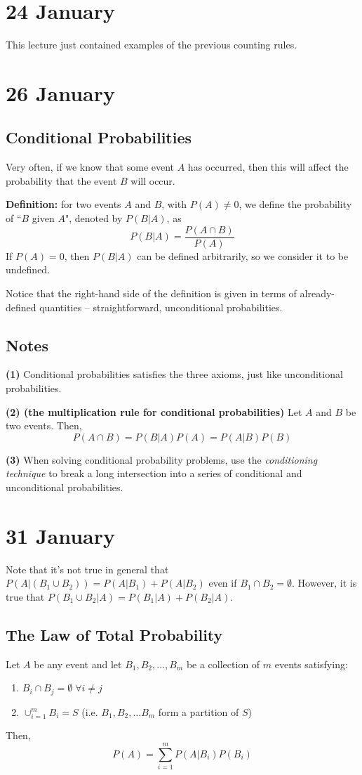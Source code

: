 \documentclass[12pt]{article}
\begin{document}
\section{24 January}
This lecture just contained examples of the previous counting rules.

\section{26 January}
\subsection{Conditional Probabilities}
Very often, if we know that some event $A$ has occurred, then this will affect the probability that the event $B$ will occur.

\textbf{Definition:} for two events $A$ and $B$, with $P(A) \neq 0$, we define the probability of ``$B$ given $A$", denoted by $P(B|A)$, as
\[
    P(B|A) = \frac{P(A \cap B)}{P(A)}
\]
If $P(A) = 0$, then $P(B|A)$ can be defined arbitrarily, so we consider it to be undefined.

Notice that the right-hand side of the definition is given in terms of already-defined quantities -- straightforward, unconditional probabilities. 

\subsection{Notes}
\textbf{(1)} Conditional probabilities satisfies the three axioms, just like unconditional probabilities.

\textbf{(2) (the multiplication rule for conditional probabilities)} Let $A$ and $B$ be two events. Then,
\[
    P(A \cap B) = P(B|A) P(A) = P(A|B) P(B)
\]

\textbf{(3)} When solving conditional probability problems, use the \emph{conditioning technique} to break a long intersection into a series of conditional and unconditional probabilities.

\section{31 January} 
Note that it's not true in general that $P(A | (B_1 \cup B_2)) = P(A | B_1) + P(A | B_2)$ even if $B_1 \cap B_2 = \emptyset$. However, it is true that $P(B_1 \cup B_2 | A) = P(B_1 | A) + P(B_2 | A)$.

\subsection{The Law of Total Probability}
Let $A$ be any event and let $B_1, B_2, \dots, B_m$ be a collection of $m$ events satisfying:
\begin{enumerate}
    \item $B_i \cap B_j = \emptyset \; \forall i \neq j$
    \item $\cup_{i=1}^{m} B_i = S$ (i.e. $B_1, B_2, \dots B_m$ form a partition of $S$)
\end{enumerate}
Then,
\[
    P(A) = \sum_{i=1}^{m} P(A | B_i) P(B_i)
\]
\end{document}
